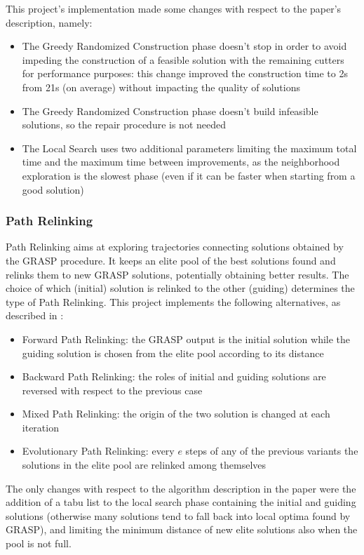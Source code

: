 This project's implementation made some changes with respect to the paper's description, namely:
\begin{itemize}[itemsep=-1mm, topsep=0mm]
	\item The Greedy Randomized Construction phase doesn't stop in order to avoid impeding the construction of a feasible solution with the remaining cutters for performance purposes: this change improved the construction time to 2s from 21s (on average) without impacting the quality of solutions
	\item The Greedy Randomized Construction phase doesn't build infeasible solutions, so the repair procedure is not needed
	\item The Local Search uses two additional parameters limiting the maximum total time and the maximum time between improvements, as the neighborhood exploration is the slowest phase (even if it can be faster when starting from a good solution\cite{local_search})
\end{itemize}

\subsubsection{Path Relinking}
Path Relinking aims at exploring trajectories connecting solutions obtained by the GRASP procedure. It keeps an elite pool of the best solutions found and relinks them to new GRASP solutions, potentially obtaining better results. The choice of which (initial) solution is relinked to the other (guiding) determines the type of Path Relinking. This project implements the following alternatives, as described in \cite{grasp}:
\begin{itemize}[itemsep=-1mm, topsep=0mm]
	\item Forward Path Relinking: the GRASP output is the initial solution while the guiding solution is chosen from the elite pool according to its distance
	\item Backward Path Relinking: the roles of initial and guiding solutions are reversed with respect to the previous case
	\item Mixed Path Relinking: the origin of the two solution is changed at each iteration
	\item Evolutionary Path Relinking: every $e$ steps of any of the previous variants the solutions in the elite pool are relinked among themselves
\end{itemize}
The only changes with respect to the algorithm description in the paper were the addition of a tabu list to the local search phase containing the initial and guiding solutions (otherwise many solutions tend to fall back into local optima found by GRASP), and limiting the minimum distance of new elite solutions also when the pool is not full.

